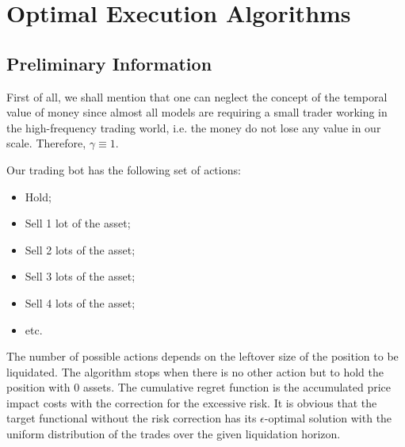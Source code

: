 \section{Optimal Execution Algorithms}\label{section:OptExecAlgos}
    \subsection{Preliminary Information}
        First of all, we shall mention that one can neglect the concept of the temporal value of money since almost all models 
        are requiring a small trader working in the high-frequency
        trading world, i.e. the money do not lose any value in our scale. Therefore, $\gamma \equiv 1$.

        Our trading bot has the following set of actions:
        \begin{itemize}\label{page:actions}
            \item Hold;
            \item Sell 1 lot of the asset;
            \item Sell 2 lots of the asset;
            \item Sell 3 lots of the asset;
            \item Sell 4 lots of the asset;
            \item etc.
        \end{itemize}
        The number of possible actions depends on the leftover size of the position to be liquidated.
        The algorithm stops when there is no other action but to hold the position with 0 assets. 
        The cumulative regret function is the accumulated price impact costs with the correction for the excessive risk.
        It is obvious that the target functional without the risk correction has its $\epsilon$-optimal 
        solution with the uniform distribution of the trades over the given liquidation horizon.

